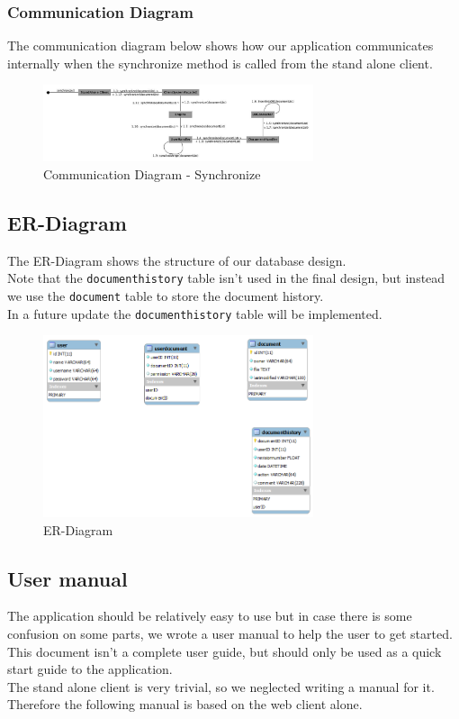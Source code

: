 \documentclass[11pt]{article}
\begin{document}
\subsubsection{Communication Diagram}
\label{sec-3-2-2}
The communication diagram below shows how our application communicates internally when the synchronize method is called from the stand alone client. 
\begin{figure}[H]
  		\centering
    	\includegraphics[width=300px]{images/CommunicationDiagram_Synchronize.jpg}
    	\caption{Communication Diagram - Synchronize}
\end{figure}
\newpage
\subsection{ER-Diagram}
\label{sec-3-3}
The ER-Diagram shows the structure of our database design. \\
Note that the \texttt{documenthistory} table isn't used in the final design, but instead we use the \texttt{document} table to store the document history. \\
In a future update the \texttt{documenthistory} table will be implemented.
\begin{figure}[H]
  		\centering
    	\includegraphics[width=300px]{images/New ER database.png}
    	\caption{ER-Diagram}
\end{figure}
\subsection{User manual}
\label{sec-3-4}
The application should be relatively easy to use but in case there is some confusion on some parts, we wrote a user manual to help the user to get started. \\
This document isn't a complete user guide, but should only be used as a quick start guide to the application. \\
The stand alone client is very trivial, so we neglected writing a manual for it. Therefore the following manual is based on the web client alone.
\end{document}
